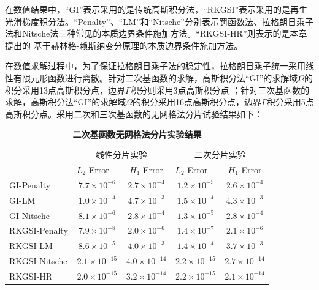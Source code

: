 在数值结果中，“GI”表示采用的是传统高斯积分法，“RKGSI”表示采用的是再生光滑梯度积分法。“Penalty”、“LM”和“Nitsche”分别表示罚函数法、拉格朗日乘子法和Nitsche法三种常见的本质边界条件施加方法。“RKGSI-HR”则表示的是本章提出的
基于赫林格-赖斯纳变分原理的本质边界条件施加方法。\par
在数值求解过程中，为了保证拉格朗日乘子法的稳定性，拉格朗日乘子统一采用线性有限元形函数进行离散。针对二次基函数的求解，高斯积分法“GI”的求解域$\Omega$的积分采用13点高斯积分点，边界$\Gamma$积分则采用3点高斯积分点
；针对三次基函数的求解，高斯积分法“GI”的求解域$\Omega$的积分采用16点高斯积分点，边界$\Gamma$积分采用5点高斯积分点。采用二次和三次基函数的无网格法分片试验结果如下：\par
\begin{table}[H]
\caption{\textbf{二次基函数无网格法分片实验结果}}
\centering
\begin{tabular}{lcccc}
   \toprule
& \multicolumn{2}{c}{线性分片实验} & \multicolumn{2}{c}{二次分片实验} \\ \cline{2-5}
   &$L_2$-Error$\quad$&$H_1$-Error&$L_2$-Error$\quad$&$H_1$-Error\\
   \midrule
   GI-Penalty&$7.7\times10^{-6}$&$2.7\times10^{-4}$&$1.2\times10^{-5}$&$2.6\times10^{-4}$\\
   GI-LM&$1.0\times10^{-4}$&$4.7\times10^{-3}$&$1.5\times10^{-4}$&$4.3\times10^{-3}$\\
   GI-Nitsche&$8.1\times10^{-6}$&$2.8\times10^{-4}$&$1.3\times10^{-5}$&$2.8\times10^{-4}$\\
  RKGSI-Penalty&$7.9\times10^{-8}$&$2.0\times10^{-6}$&$1.4\times10^{-7}$&$2.1\times10^{-6}$\\
  RKGSI-LM&$8.6\times10^{-5}$&$4.0\times10^{-3}$&$1.4\times10^{-4}$&$3.7\times10^{-3}$\\
  RKGSI-Nitsche&$2.1\times10^{-15}$&$4.0\times10^{-14}$&$2.2\times10^{-15}$&$2.7\times10^{-14}$\\
  RKGSI-HR&$2.0\times10^{-15}$&$3.2\times10^{-14}$&$2.2\times10^{-15}$&$2.1\times10^{-14}$\\
\bottomrule
\end{tabular}
\end{table}
